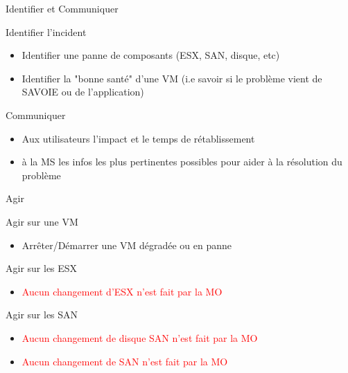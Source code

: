 \begin{frame}{Identifier et Communiquer}
\begin{block}{Identifier l'incident}
\begin{itemize}
\item Identifier une panne de composants (ESX, SAN, disque, etc)
\item Identifier la "bonne santé" d'une VM (i.e savoir si le problème vient de SAVOIE ou de l'application)
\end{itemize}\pause
\end{block}
\begin{block}{Communiquer}
\begin{itemize}
\item Aux utilisateurs l'impact et le temps de rétablissement
\item à la MS les infos les plus pertinentes possibles pour aider à la résolution du problème
\end{itemize}
\end{block}
\end{frame}

\begin{frame}{Agir}
\begin{block}{Agir sur une VM}
\begin{itemize}
\item Arrêter/Démarrer une VM dégradée ou en panne
\end{itemize}
\end{block}
\begin{block}{Agir sur les ESX}
\begin{itemize}
\item \textcolor{red}{Aucun changement d'ESX n'est fait par la MO}
\end{itemize}
\end{block}
\begin{block}{Agir sur les SAN}
\begin{itemize}
\item \textcolor{red}{Aucun changement de disque SAN n'est fait par la MO}
\item \textcolor{red}{Aucun changement de SAN n'est fait par la MO}
\end{itemize}
\end{block}
\end{frame}